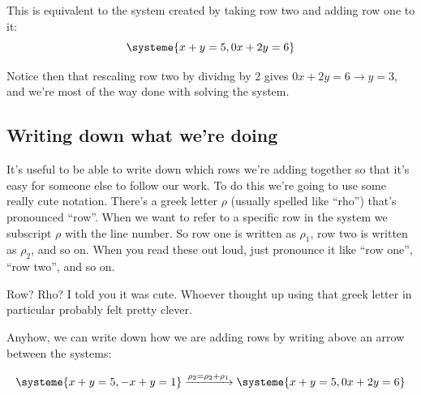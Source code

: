 \documentclass[a4paper,twoside,12pt]{memoir}  %
\begin{document}
This is equivalent to the system created by taking row two and adding row one to it:
\begin{equation*}
  \systeme{
     x +  y = 5,
    0x + 2y = 6
  }
\end{equation*}

Notice then that rescaling row two by dividng by 2 gives $0x + 2y = 6 \rightarrow y = 3$, and we're most of the way done with solving the system.

\subsection{Writing down what we're doing}
It's useful to be able to write down which rows we're adding together so that it's easy for someone else to follow
our work.
To do this we're going to use some really cute notation.
There's a greek letter $\rho$ (usually spelled like ``rho'') that's pronounced ``row''.
When we want to refer to a specific row in the system we subscript $\rho$ with the line number.
So row one is written as $\rho_1$, row two is written as $\rho_2$, and so on.
When you read these out loud, just pronounce it like ``row one'', ``row two'', and so on.

Row? Rho? I told you it was cute. Whoever thought up using that greek letter in particular probably felt pretty clever.

Anyhow, we can write down how we are adding rows by writing above an arrow between the systems:

\begin{equation*}
  \systeme{
     x + y = 5,
    -x + y = 1
  }
  \xrightarrow{\rho_2 = \rho_2 + \rho_1}
  \systeme{
     x +  y = 5,
    0x + 2y = 6
  }
\end{equation*}
\end{document}
